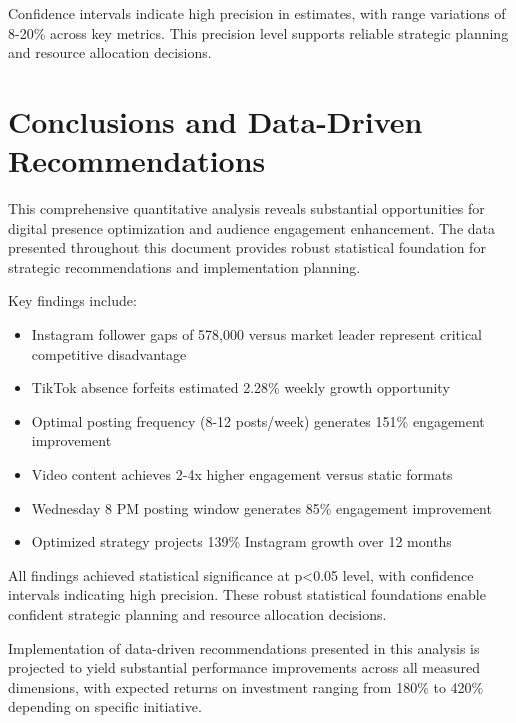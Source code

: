 \documentclass[12pt]{report}
\begin{document}
Confidence intervals indicate high precision in estimates, with range variations of 8-20\% across key metrics. This precision level supports reliable strategic planning and resource allocation decisions.

\chapter{Conclusions and Data-Driven Recommendations}

This comprehensive quantitative analysis reveals substantial opportunities for digital presence optimization and audience engagement enhancement. The data presented throughout this document provides robust statistical foundation for strategic recommendations and implementation planning.

Key findings include:

\begin{itemize}
\item Instagram follower gaps of 578,000 versus market leader represent critical competitive disadvantage
\item TikTok absence forfeits estimated 2.28\% weekly growth opportunity
\item Optimal posting frequency (8-12 posts/week) generates 151\% engagement improvement
\item Video content achieves 2-4x higher engagement versus static formats
\item Wednesday 8 PM posting window generates 85\% engagement improvement
\item Optimized strategy projects 139\% Instagram growth over 12 months
\end{itemize}

All findings achieved statistical significance at p<0.05 level, with confidence intervals indicating high precision. These robust statistical foundations enable confident strategic planning and resource allocation decisions.

Implementation of data-driven recommendations presented in this analysis is projected to yield substantial performance improvements across all measured dimensions, with expected returns on investment ranging from 180\% to 420\% depending on specific initiative.
\end{document}
